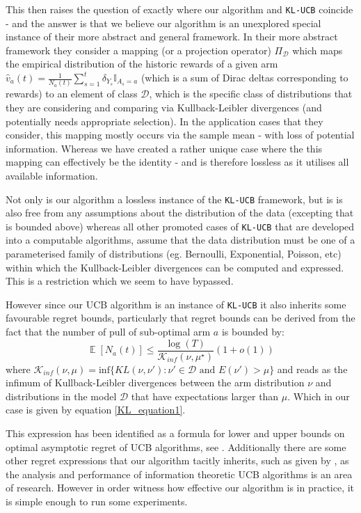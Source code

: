 \documentclass[12pt]{colt2020} %
\DeclareMathOperator{\E}{\mathbb{E}}
\begin{document}
This then raises the question of exactly where our algorithm and \texttt{KL-UCB} coincide - and the answer is that we believe our algorithm is an unexplored special instance of their more abstract and general framework.
In their more abstract framework they consider a mapping (or a projection operator) $\Pi_\mathcal{D}$ which maps the empirical distribution of the historic rewards of a given arm $\hat{v}_a(t)=\frac{1}{N_a(t)}\sum_{s=1}^t\delta_{Y_s}\mathbb{I}_{A_s=a} $ (which is a sum of Dirac deltas corresponding to rewards) to an element of class $\mathcal{D}$, which is the specific class of distributions that they are considering and comparing via Kullback-Leibler divergences (and potentially needs appropriate selection).
In the application cases that they consider, this mapping mostly occurs via the sample mean - with loss of potential information. Whereas we have created a rather unique case where the this mapping can effectively be the identity - and is therefore lossless as it utilises all available information.

Not only is our algorithm a lossless instance of the \texttt{KL-UCB} framework, but is is also free from any assumptions about the distribution of the data (excepting that is bounded above) whereas all other promoted cases of \texttt{KL-UCB} that are developed into a computable algorithms, assume that the data distribution must be one of a parameterised family of distributions (eg. Bernoulli, Exponential, Poisson, etc) within which the Kullback-Leibler divergences can be computed and expressed. This is a restriction which we seem to have bypassed.

However since our UCB algorithm is an instance of \texttt{KL-UCB} it also inherits some favourable regret bounds, particularly that regret bounds can be derived from the fact that the number of pull of sub-optimal arm $a$ is bounded by:
$$ \E[N_a(t)] \le \frac{\log(T)}{\mathcal{K}_{inf}(\nu,\mu^\star)}(1+o(1)) $$
where $\mathcal{K}_{inf}(\nu,\mu) = \text{inf}\{KL(\nu,\nu'):\nu'\in\mathcal{D}\mbox{ and }E(\nu')>\mu\}$ and reads as the infimum of Kullback-Leibler divergences between the arm distribution $\nu$ and distributions in the model $\mathcal{D}$ that have expectations larger than $\mu$.
Which in our case is given by equation \ref{KL_equation1}.

This expression has been identified as a formula for lower and upper bounds on optimal asymptotic regret of UCB algorithms, see \cite{Maillard11afinite-time}. Additionally there are some other regret expressions that our algorithm tacitly inherits, such as given by \cite{5b3d98cc17c44a510f801b3f}, as the analysis and performance of information theoretic UCB algorithms is an area of research. However in order witness how effective our algorithm is in practice, it is simple enough to run some experiments.
\end{document}
